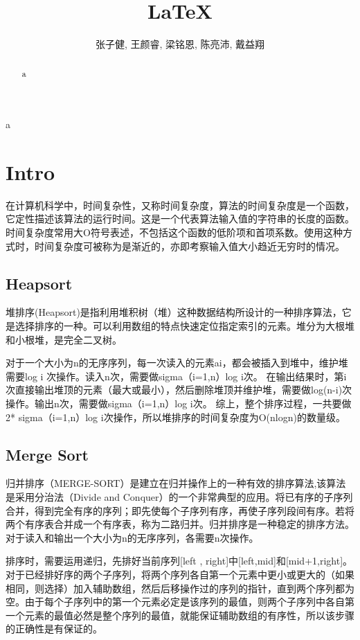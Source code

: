 \documentclass[UTF8]{ctexart}
\title{\LaTeX}
\author{张子健, 王颜睿, 梁铭恩, 陈亮沛, 戴益翔}
\begin{document}
\begin{center}
	\begin{abstract}
		a
	\end{abstract}
	\begin{keywords}
		a
	\end{keywords}
\end{center}

\section{Intro}
\label{sec:introduction}
在计算机科学中，时间复杂性，又称时间复杂度，算法的时间复杂度是一个函数，它定性描述该算法的运行时间。这是一个代表算法输入值的字符串的长度的函数。时间复杂度常用大O符号表述，不包括这个函数的低阶项和首项系数。使用这种方式时，时间复杂度可被称为是渐近的，亦即考察输入值大小趋近无穷时的情况。

\subsection{Heapsort}
\label{subsec:heapsort}
堆排序(Heapsort)是指利用堆积树（堆）这种数据结构所设计的一种排序算法，它是选择排序的一种。可以利用数组的特点快速定位指定索引的元素。堆分为大根堆和小根堆，是完全二叉树。

对于一个大小为n的无序序列，每一次读入的元素ai，都会被插入到堆中，维护堆需要log i 次操作。读入n次，需要做sigma（i=1,n）log i次。
在输出结果时，第i次直接输出堆顶的元素（最大或最小），然后删除堆顶并维护堆，需要做log(n-i)次操作。输出n次，需要做sigma（i=1,n）log i次。
综上，整个排序过程，一共要做2* sigma（i=1,n）log i次操作，所以堆排序的时间复杂度为O(nlogn)的数量级。

\subsection{Merge Sort}
\label{subsec:mergesort}
归并排序（MERGE-SORT）是建立在归并操作上的一种有效的排序算法,该算法是采用分治法（Divide and Conquer）的一个非常典型的应用。将已有序的子序列合并，得到完全有序的序列；即先使每个子序列有序，再使子序列段间有序。若将两个有序表合并成一个有序表，称为二路归并。归并排序是一种稳定的排序方法。
对于读入和输出一个大小为n的无序序列，各需要n次操作。

排序时，需要运用递归，先排好当前序列[left , right]中[left,mid]和[mid+1,right]。对于已经排好序的两个子序列，将两个序列各自第一个元素中更小或更大的（如果相同，则选择）加入辅助数组，然后后移操作过的序列的指针，直到两个序列都为空。由于每个子序列中的第一个元素必定是该序列的最值，则两个子序列中各自第一个元素的最值必然是整个序列的最值，就能保证辅助数组的有序性，所以该步骤的正确性是有保证的。
\end{document}
